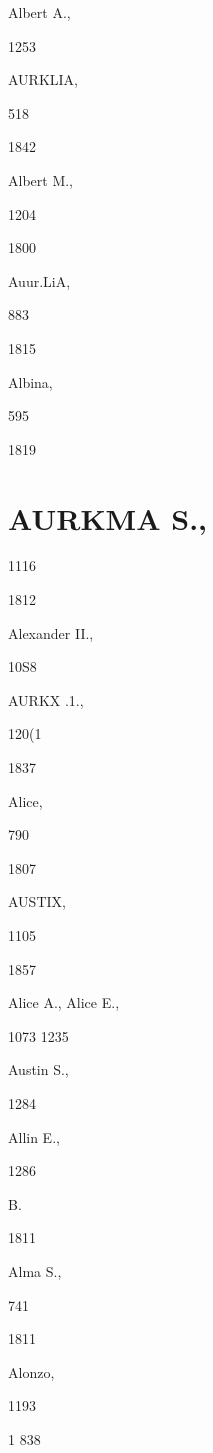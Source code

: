 Albert A., 


1253 




AURKLIA, 


518 


1842 


Albert M., 


1204 


1800 


Auur.LiA, 


883 


1815 


Albina, 


595 


1819 


\chapter{AURKMA S.,}

1116 


1812 


Alexander II., 


10S8 




AURKX .1., 


120(1 


1837 


Alice, 


790 


1807 


AUSTIX, 


1105 


1857 


Alice A., 
Alice E., 


1073 
1235 




Austin S., 


1284 




Allin E., 


1286 




B. 




1811 


Alma S., 


741 








1811 


Alonzo, 


1193 


1 838 


